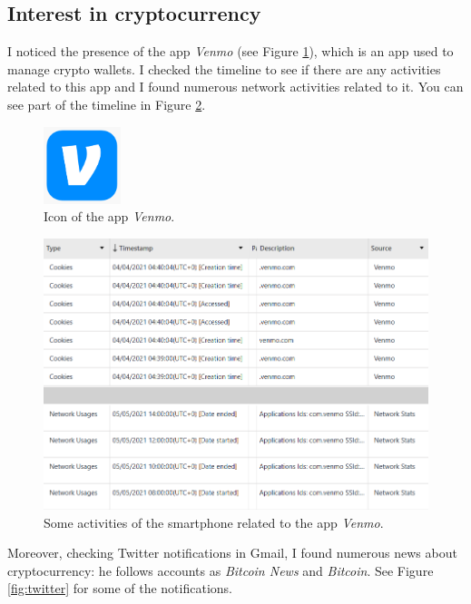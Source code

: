 \documentclass[12pt]{article}
\begin{document}
\subsection{Interest in cryptocurrency}

I noticed the presence of the app \textit{Venmo} (see Figure \ref{fig:venmo-icon}), which is an app used to manage crypto wallets. I checked the timeline to see if there are any activities related to this app and I found numerous network activities related to it. You can see part of the timeline in Figure \ref{fig:crypto}.

\begin{figure}[!ht]
    \centering
    \includegraphics[width=0.2\textwidth]{images/venmo.png}
    \caption{Icon of the app \textit{Venmo}.}
    \label{fig:venmo-icon}
\end{figure}

\begin{figure}[!ht]
    \centering
    \includegraphics[width=\textwidth]{images/venmo1.png}
    \caption{Some activities of the smartphone related to the app \textit{Venmo}.}
    \label{fig:crypto}
\end{figure}

Moreover, checking Twitter notifications in Gmail, I found numerous news about cryptocurrency: he follows accounts as \textit{Bitcoin News} and \textit{Bitcoin}. See Figure \ref{fig:twitter} for some of the notifications.
\end{document}
